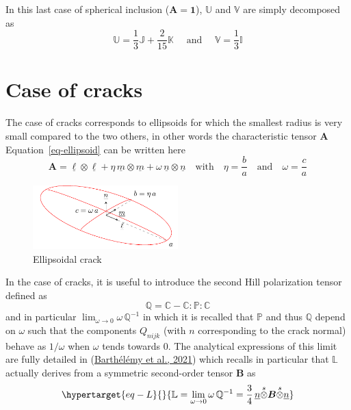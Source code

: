 \documentclass[
  letterpaper,
  DIV=11,
  numbers=noendperiod]{scrreprt}
\begin{document}
In this last case of spherical inclusion
(\({\mathbf{\boldsymbol{{A}}}}={\mathbf{\boldsymbol{{1}}}}\)),
\({\mathbb{{U}}}\) and \({\mathbb{{V}}}\) are simply decomposed as \[
{\mathbb{{U}}}=\frac{1}{3}{\mathbb{{J}}}+\frac{2}{15}{\mathbb{{K}}}
\quad\textrm{ and }\quad
{\mathbb{{V}}}=\frac{1}{3}{\mathbb{{I}}}
\]

\hypertarget{case-of-cracks}{%
\section{Case of cracks}\label{case-of-cracks}}

The case of cracks corresponds to ellipsoids for which the smallest
radius is very small compared to the two others, in other words the
characteristic tensor \({\mathbf{\boldsymbol{{A}}}}\)
Equation~\ref{eq-ellipsoid} can be written here \[
{\mathbf{\boldsymbol{{A}}}}=
{\underline{{\ell}}}\otimes{\underline{{\ell}}}+
\eta\,{\underline{{m}}}\otimes{\underline{{m}}}+
\omega\,{\underline{{n}}}\otimes{\underline{{n}}}
\quad\textrm{with}\quad
\eta=\frac{b}{a}
\quad\textrm{and}\quad
\omega=\frac{c}{a}
\]

\begin{figure}

{\centering 

\includegraphics[width=0.5\textwidth,height=\textheight]{./images/ellipsoidalcrack.pdf}

}

\caption{\label{fig-crack}Ellipsoidal crack}

\end{figure}

In the case of cracks, it is useful to introduce the second Hill
polarization tensor defined as \[
{\mathbb{{Q}}}={\mathbb{{C}}}-{\mathbb{{C}}}:{\mathbb{{P}}}:{\mathbb{{C}}}
\] and in particular \(\lim_{\omega\to 0}\omega\,{\mathbb{{Q}}}^{-1}\)
in which it is recalled that \({\mathbb{{P}}}\) and thus
\({\mathbb{{Q}}}\) depend on \(\omega\) such that the components
\(Q_{nijk}\) (with \(n\) corresponding to the crack normal) behave as
\(1/\omega\) when \(\omega\) tends towards \(0\). The analytical
expressions of this limit are fully detailed in
(\protect\hyperlink{ref-barthelemy2021}{Barthélémy et al., 2021}) which
recalls in particular that \({\mathbb{{L}}}\) actually derives from a
symmetric second-order tensor \({\mathbf{\boldsymbol{{B}}}}\) as
\begin{equation}\protect\hypertarget{eq-L}{}{
{\mathbb{{L}}}=
\lim_{\omega\to 0} \omega\,{\mathbb{{Q}}}^{-1}
=\frac{3}{4}\,{\underline{{n}}}{\stackrel{s}{\otimes}}{\mathbf{\boldsymbol{{B}}}}{\stackrel{s}{\otimes}}{\underline{{n}}}
}\label{eq-L}\end{equation}
\end{document}
